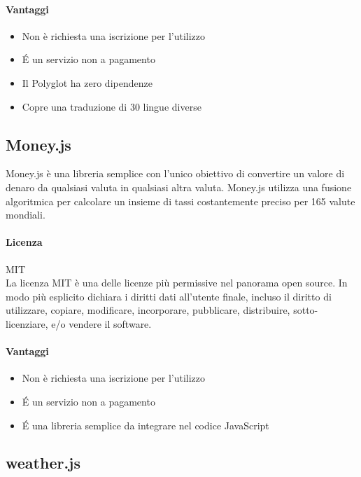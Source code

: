 \paragraph{Vantaggi}
\begin{itemize}
	\item Non è richiesta una iscrizione per l'utilizzo
	\item \'E un servizio non a pagamento
	\item Il Polyglot ha zero dipendenze
	\item Copre una traduzione di 30 lingue diverse
\end{itemize}




\subsection{Money.js}

Money.js è una libreria semplice con l'unico obiettivo di convertire
un valore di denaro da qualsiasi valuta in qualsiasi altra
valuta. Money.js utilizza una fusione algoritmica per calcolare un
insieme di tassi costantemente preciso per 165 valute mondiali. 
 \\

\paragraph{Licenza} MIT \\
La licenza MIT è una delle licenze più permissive nel panorama open
source. In modo più esplicito dichiara i diritti dati all'utente
finale, incluso il diritto di utilizzare, copiare, modificare,
incorporare, pubblicare, distribuire, sotto-licenziare, e/o vendere il
software.\\ 

\paragraph{Vantaggi}
\begin{itemize}
	\item Non è richiesta una iscrizione per l'utilizzo
	\item \'E un servizio non a pagamento
	\item \'E una libreria semplice da integrare nel codice JavaScript
\end{itemize}


\subsection{weather.js}

